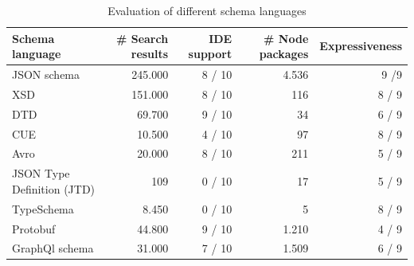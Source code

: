 \begin{table}[]
    \centering
    \caption{Evaluation of different schema languages\label{tab:all}}
    \begin{tabular}{@{}lrrrr@{}}
        \toprule
        \textbf{Schema language} &
        \textbf{\# Search results } &
        \textbf{IDE support} &
        \textbf{\# Node packages} &
        \textbf{Expressiveness} \\ \midrule
        JSON schema &
        245.000 &
        8 / 10 &
        4.536 & 9 /9 \\
        XSD & 151.000 & 8 / 10 & 116 & 8 / 9 \\
        DTD & 69.700 & 9 / 10 & 34 & 6 / 9 \\
        CUE & 10.500 & 4 / 10 & 97 &   8 / 9 \\
        Avro & 20.000 & 8 / 10 & 211 &  5 / 9 \\
        JSON Type Definition (JTD) &  109 & 0 / 10 &  17 & 5 / 9 \\
        TypeSchema &  8.450 & 0 / 10 & 5 & 8 / 9 \\
        Protobuf &  44.800 & 9 / 10 & 1.210 & 4 / 9 \\
        GraphQl schema & 31.000 & 7 / 10 & 1.509 & 6 / 9\\ \bottomrule
    \end{tabular}
\end{table}


